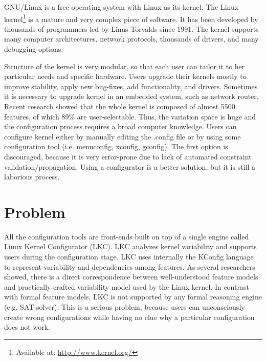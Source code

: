 \documentclass{chi2009}
\begin{document}
GNU/Linux is a free operating system with Linux as its kernel. The Linux kernel\footnote{Available at: \url{http://www.kernel.org/}} is a mature and very complex piece of software. It has been developed by thousands of programmers led by Linus Torvalds since 1991. The kernel supports many computer architectures, network protocols, thousands of drivers, and many debugging options.


Structure of the kernel is very modular, so that each user can tailor it to her particular needs and specific hardware. Users upgrade their kernels mostly to improve stability, apply new bug-fixes, add functionality, and drivers. Sometimes it is necessary to upgrade kernel in an embedded system, such as network router. Recent research \cite{she:kernel:2010} showed that the whole kernel is composed of almost 5500 features, of which 89\% are user-selectable. Thus, the variation space is huge and the configuration process requires a broad computer knowledge. Users can configure kernel either by manually editing the \textsf{.config} file or by using some configuration tool (i.e. \textsf{menuconfig, xconfig, gconfig}). The first option is discouraged, because it is very error-prone due to lack of automated constraint validation/propagation. Using a configurator is a better solution, but it is still a laborious process.

\section{Problem}
All the configuration tools are front-ends built on top of a single engine called Linux Kernel Configurator (LKC). LKC analyzes kernel variability and supports users during the configuration stage. LKC uses internally the KConfig language to represent variability and dependencies among features. As several researchers \cite{sincero:lkc:2008,she:kernel:2010} showed, there is a direct correspondence between well-understood feature models and practically crafted variability model used by the Linux kernel. In contrast with formal feature models, LKC is not supported by any formal reasoning engine (e.g. SAT-solver). This is a serious problem, because users can unconsciously create wrong configurations while having no clue why a particular configuration does not work.
\end{document}
